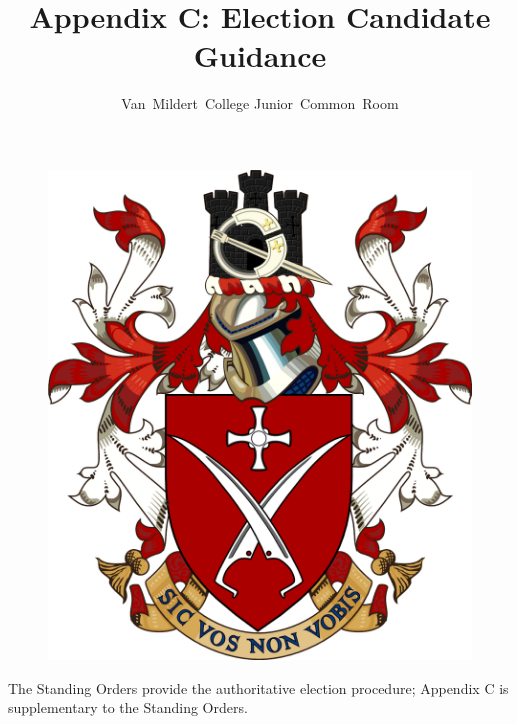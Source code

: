 \documentclass[12pt]{article}
\title{Appendix C: Election Candidate Guidance}
\author{Van~Mildert~College Junior~Common~Room}
\date{\thedate}
\begin{document}
    \begin{titlepage}  %
        \maketitle
        \begin{figure}[h]
            \includegraphics[scale=0.25]{arms}  %
            \centering
        \end{figure}
        \thispagestyle{empty}
    \end{titlepage}
    \setcounter{page}{2}  %

    The Standing Orders provide the authoritative election procedure; Appendix C is supplementary to the Standing Orders.

    \setcounter{section}{-1}
\end{document}

